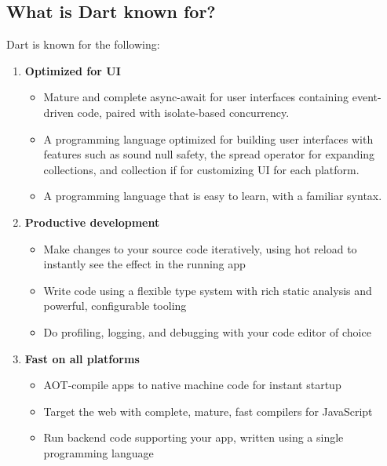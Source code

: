 \subsection{What is Dart known for?\cite{dart:dev}}
Dart is known for the following:
\begin{enumerate}
    \item \textbf{Optimized for UI}
    \begin{itemize}
        \item Mature and complete async-await for user interfaces containing event-driven code, paired with isolate-based concurrency.
        \item A programming language optimized for building user interfaces with features such as sound null safety, the spread operator for expanding collections, and collection if for customizing UI for each platform.
        \item A programming language that is easy to learn, with a familiar syntax.
    \end{itemize}
    \item \textbf{Productive development}
    \begin{itemize}
        \item Make changes to your source code iteratively, using hot reload to instantly see the effect in the running app
        \item Write code using a flexible type system with rich static analysis and powerful, configurable tooling
        \item Do profiling, logging, and debugging with your code editor of choice
    \end{itemize}
    \item \textbf{Fast on all platforms}
    \begin{itemize}
        \item AOT-compile apps to native machine code for instant startup
        \item Target the web with complete, mature, fast compilers for JavaScript
        \item Run backend code supporting your app, written using a single programming language
    \end{itemize}
\end{enumerate}
